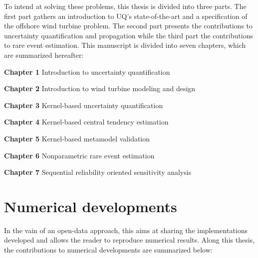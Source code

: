 To intend at solving these problems, this thesis is divided into three parts. 
The first part gathers an introduction to UQ's state-of-the-art and a specification of the offshore wind turbine problem.
The second part presents the contributions to uncertainty quantification and propagation while the third part the contributions to rare event estimation.
This manuscript is divided into seven chapters, which are summarized hereafter: 

\textbf{Chapter 1} Introduction to uncertainty quantification 

\textbf{Chapter 2} Introduction to wind turbine modeling and design

\textbf{Chapter 3} Kernel-based uncertainty quantification

\textbf{Chapter 4} Kernel-based central tendency estimation

\textbf{Chapter 5} Kernel-based metamodel validation

\textbf{Chapter 6} Nonparametric rare event estimation

\textbf{Chapter 7} Sequential reliability oriented sensitivity analysis


\clearpage
\section*{Numerical developments}


In the vain of an open-data approach, this aims at sharing the implementations developed and allows the reader to reproduce numerical results.
Along this thesis, the contributions to numerical developments are summarized below: 


